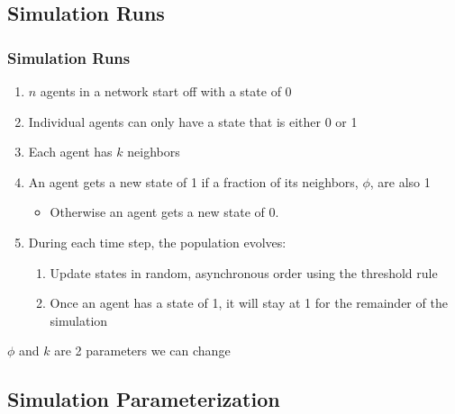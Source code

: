 \documentclass[compress]{beamer}
\begin{document}
\subsection{Simulation Runs}

    \begin{frame}[Basic2]\frametitle{Simulation Runs}
        \vspace{2mm}
        \footnotesize{
            \begin{enumerate}
                \item $n$ agents in a network start off with a state of 0
                \item Individual agents can only have a state that is either 0 or 1
                \item Each agent has $k$ neighbors
                \item An agent gets a new state of 1 if a fraction of its neighbors, $\phi$, are also 1
                    \begin{itemize}
                        \item Otherwise an agent gets a new state of 0.
                    \end{itemize}
                \item During each time step, the population evolves:
                    \begin{enumerate}
                        \item Update states in random, asynchronous order using the threshold rule
                        \item Once an agent has a state of 1, it will stay at 1 for the remainder of the simulation
                    \end{enumerate}
            \end{enumerate}
        }
        \vspace{2mm}
        \scriptsize{$\phi$ and $k$ are 2 parameters we can change}
    \end{frame}

\subsection{Simulation Parameterization}
\end{document}

